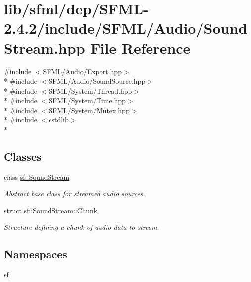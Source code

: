 \hypertarget{sfml_2dep_2_s_f_m_l-2_84_82_2include_2_s_f_m_l_2_audio_2_sound_stream_8hpp}{\section{lib/sfml/dep/\-S\-F\-M\-L-\/2.4.2/include/\-S\-F\-M\-L/\-Audio/\-Sound\-Stream.hpp File Reference}
\label{sfml_2dep_2_s_f_m_l-2_84_82_2include_2_s_f_m_l_2_audio_2_sound_stream_8hpp}
}
{\ttfamily \#include $<$S\-F\-M\-L/\-Audio/\-Export.\-hpp$>$}\\*
{\ttfamily \#include $<$S\-F\-M\-L/\-Audio/\-Sound\-Source.\-hpp$>$}\\*
{\ttfamily \#include $<$S\-F\-M\-L/\-System/\-Thread.\-hpp$>$}\\*
{\ttfamily \#include $<$S\-F\-M\-L/\-System/\-Time.\-hpp$>$}\\*
{\ttfamily \#include $<$S\-F\-M\-L/\-System/\-Mutex.\-hpp$>$}\\*
{\ttfamily \#include $<$cstdlib$>$}\\*
\subsection*{Classes}
\begin{DoxyCompactItemize}
\item 
class \hyperlink{classsf_1_1_sound_stream}{sf\-::\-Sound\-Stream}
\begin{DoxyCompactList}\small\item\em Abstract base class for streamed audio sources. \end{DoxyCompactList}\item 
struct \hyperlink{structsf_1_1_sound_stream_1_1_chunk}{sf\-::\-Sound\-Stream\-::\-Chunk}
\begin{DoxyCompactList}\small\item\em Structure defining a chunk of audio data to stream. \end{DoxyCompactList}\end{DoxyCompactItemize}
\subsection*{Namespaces}
\begin{DoxyCompactItemize}
\item 
\hyperlink{namespacesf}{sf}
\end{DoxyCompactItemize}

